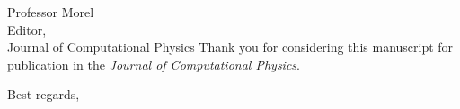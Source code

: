 \begin{letter}{Professor Morel\\
    Editor,\\
    Journal of Computational Physics}
Thank you for considering this manuscript for publication in the {\it Journal of Computational Physics}.

\vspace{0.25cm}



\closing{Best regards, }

\end{letter}


